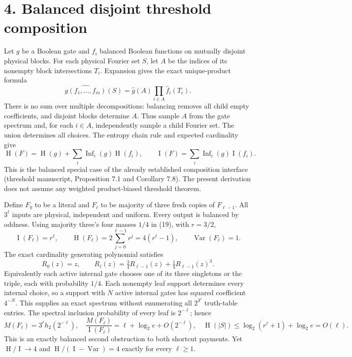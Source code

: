 \documentclass[11pt]{article}
\newcommand{\I}{\operatorname{I}}
\newcommand{\Var}{\operatorname{Var}}
\newcommand{\HH}{\operatorname{H}}
\begin{document}
\section*{4. Balanced disjoint threshold composition}
Let $g$ be a Boolean gate and $f_i$ balanced Boolean functions on
mutually disjoint physical blocks. For each physical Fourier set $S$,
let $A$ be the indices of its nonempty block intersections $T_i$.
Expansion gives the exact unique-product formula
\[
 \widehat{g(f_1,\ldots,f_m)}(S)
 =\widehat g(A)\prod_{i\in A}\widehat f_i(T_i).               \tag{18}
\]
There is no sum over multiple decompositions: balancing removes
all child empty coefficients, and disjoint blocks determine $A$.
Thus sample $A$ from the gate spectrum and, for each $i\in A$,
independently sample a child Fourier set. The union determines
all choices. The entropy chain rule and expected cardinality give
\[
 \HH(F)=\HH(g)+\sum_i\operatorname{Inf}_i(g)\HH(f_i),\qquad
 \I(F)=\sum_i\operatorname{Inf}_i(g)\I(f_i).                 \tag{19}
\]
This is the balanced special case of the already established
composition interface (threshold manuscript, Proposition 7.1 and
Corollary 7.8). The present derivation does not assume any weighted
product-biased threshold theorem.

Define $F_0$ to be a literal and $F_\ell$ to be majority of three
fresh copies of $F_{\ell-1}$. All $3^\ell$ inputs are physical,
independent and uniform. Every output is balanced by oddness.
Using majority three's four masses $1/4$ in (19), with $r=3/2$,
\[
 \I(F_\ell)=r^\ell,\qquad
 \HH(F_\ell)=2\sum_{j=0}^{\ell-1}r^j
             =4(r^\ell-1),\qquad\Var(F_\ell)=1.             \tag{20}
\]
The exact cardinality generating polynomial satisfies
\[
 R_0(z)=z,\qquad R_\ell(z)=\tfrac34R_{\ell-1}(z)
                             +\tfrac14R_{\ell-1}(z)^3.        \tag{21}
\]
Equivalently each active internal gate chooses one of its three
singletons or the triple, each with probability $1/4$.
Each nonempty leaf support determines every internal choice,
so a support with $N$ active internal gates has squared
coefficient $4^{-N}$. This supplies an exact spectrum without
enumerating all $2^{3^\ell}$ truth-table entries.
The spectral inclusion probability of every leaf is $2^{-\ell}$;
hence
\[
 M(F_\ell)=3^\ell h_2(2^{-\ell}),\quad
 \frac{M(F_\ell)}{\I(F_\ell)}
       =\ell+\log_2 e+O(2^{-\ell}),\quad
 \HH(|S|)\le\log_2(r^\ell+1)+\log_2 e=O(\ell).             \tag{22}
\]
This is an exactly balanced second obstruction to both shortcut
payments. Yet $\HH/\I\to4$ and
$\HH/(\I-\Var)=4$ exactly for every $\ell\ge1$.
\end{document}
